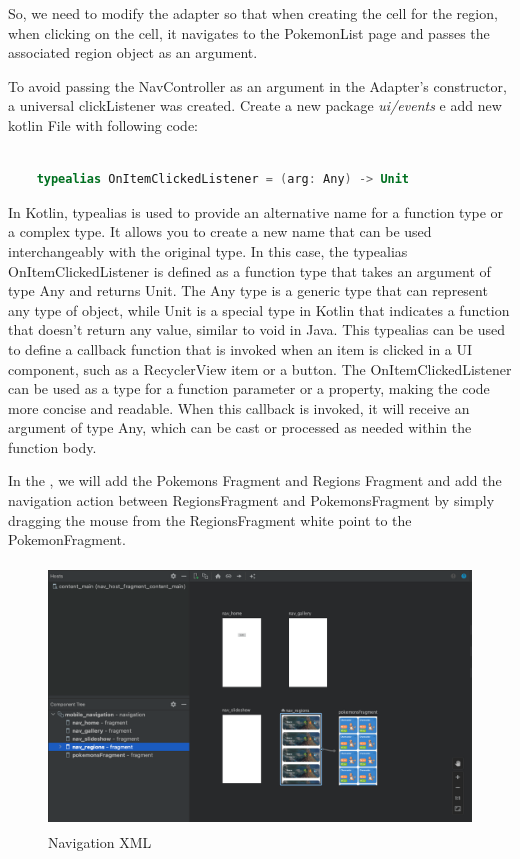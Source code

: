 \documentclass[a4paper, 12pt]{article}
\begin{document}
So, we need to modify the adapter so that when creating the cell for the region, when clicking on the cell, it navigates to the PokemonList page and passes the associated region object as an argument.

To avoid passing the NavController as an argument in the Adapter's constructor, a universal clickListener was created.
Create a new package \textit{ui/events} e add new kotlin File with following code:

\begin{lstlisting}[caption={Universal Click Listener.}, label={code:code_universal_listener_click}, language=Kotlin]

    typealias OnItemClickedListener = (arg: Any) -> Unit

\end{lstlisting}

In Kotlin, typealias is used to provide an alternative name for a function type or a complex type. 
It allows you to create a new name that can be used interchangeably with the original type.
In this case, the typealias OnItemClickedListener is defined as a function type that takes an argument of type Any and returns Unit. 
The Any type is a generic type that can represent any type of object, while Unit is a special type in Kotlin that indicates a function that doesn't return any value, similar to void in Java.
This typealias can be used to define a callback function that is invoked when an item is clicked in a UI component, such as a RecyclerView item or a button. 
The OnItemClickedListener can be used as a type for a function parameter or a property, making the code more concise and readable. 
When this callback is invoked, it will receive an argument of type Any, which can be cast or processed as needed within the function body.

In the  \textit{\texttt{}} , we will add the Pokemons Fragment and Regions Fragment and add the navigation action between RegionsFragment and PokemonsFragment by simply dragging the mouse from the RegionsFragment white point to the PokemonFragment.

\begin{figure}[h]
	\centering
	\includegraphics[height=7cm]{imgs/nav_xml.png}
	\caption{Navigation XML}
	\label{fig:pj_packges}
\end{figure}
\end{document}
